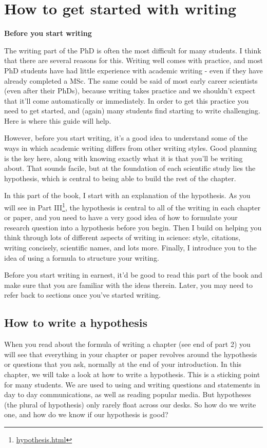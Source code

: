 \documentclass[
]{krantz}
\renewcommand{\href}[2]{#2\footnote{\url{#1}}}
\begin{document}
\hypertarget{part2}{%
\chapter{How to get started with writing}\label{part2}}

\textbf{Before you start writing}

The writing part of the PhD is often the most difficult for many students. I think that there are several reasons for this. Writing well comes with practice, and most PhD students have had little experience with academic writing - even if they have already completed a MSc. The same could be said of most early career scientists (even after their PhDs), because writing takes practice and we shouldn't expect that it'll come automatically or immediately. In order to get this practice you need to get started, and (again) many students find starting to write challenging. Here is where this guide will help.

However, before you start writing, it's a good idea to understand some of the ways in which academic writing differs from other writing styles. Good planning is the key here, along with knowing exactly what it is that you'll be writing about. That sounds facile, but at the foundation of each scientific study lies the hypothesis, which is central to being able to build the rest of the chapter.

In this part of the book, I start with an explanation of the hypothesis. As you will see in \href{hypothesis.html}{Part III}, the hypothesis is central to all of the writing in each chapter or paper, and you need to have a very good idea of how to formulate your research question into a hypothesis before you begin. Then I build on helping you think through lots of different aspects of writing in science: style, citations, writing concisely, scientific names, and lots more. Finally, I introduce you to the idea of using a formula to structure your writing.

Before you start writing in earnest, it'd be good to read this part of the book and make sure that you are familiar with the ideas therein. Later, you may need to refer back to sections once you've started writing.

\hypertarget{hypothesis}{%
\section{How to write a hypothesis}\label{hypothesis}}

When you read about the formula of writing a chapter (see end of part 2) you will see that everything in your chapter or paper revolves around the hypothesis or questions that you ask, normally at the end of your introduction. In this chapter, we will take a look at how to write a hypothesis. This is a sticking point for many students. We are used to using and writing questions and statements in day to day communications, as well as reading popular media. But hypotheses (the plural of hypothesis) only rarely float across our desks. So how do we write one, and how do we know if our hypothesis is good?
\end{document}
